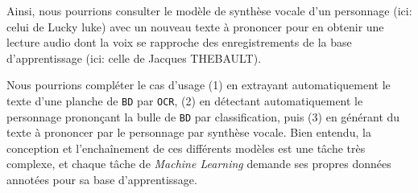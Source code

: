 			Ainsi, nous pourrions consulter le modèle de synthèse vocale d'un personnage (ici: celui de Lucky luke) avec un nouveau texte à prononcer pour en obtenir une lecture audio dont la voix se rapproche des enregistrements de la base d'apprentissage (ici: celle de Jacques THEBAULT).
			
			\begin{leftBarInformation}
				Nous pourrions compléter le cas d'usage (1) en extrayant automatiquement le texte d'une planche de \texttt{BD} par \texttt{OCR}, (2) en détectant automatiquement le personnage prononçant la bulle de \texttt{BD} par classification, puis (3) en générant du texte à prononcer par le personnage par synthèse vocale.
				Bien entendu, la conception et l’enchaînement de ces différents modèles est une tâche très complexe, et chaque tâche de \textit{Machine Learning} demande ses propres données annotées pour sa base d'apprentissage.
			\end{leftBarInformation}
			
			
		
